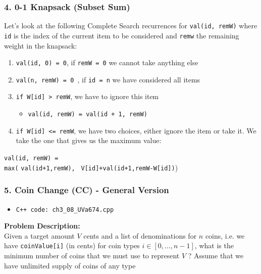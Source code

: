 \documentclass{beamer}
\begin{document}
\begin{frame}[fragile]
\frametitle{4. 0-1 Knapsack (Subset Sum)}

Let's look at the following Complete Search recurrences for \verb|val(id, remW)| where \verb|id| is the index of the current item to be considered and \verb|remw| the remaining weight in the knapsack:

\begin{enumerate}
    \item \color{blue}\verb|val(id, 0) = 0|\color{black}, if \verb|remW = 0| we cannot take anything else
    \pause    
    \item \color{blue}\verb|val(n, remW) = 0 |\color{black}, if \verb|id = n| we have considered all items
    \pause
    \item \color{blue}\verb|if W[id] > remW|\color{black}, we have to ignore this item
    \begin{itemize}
        \item \verb|val(id, remW) = val(id + 1, remW)|
    \end{itemize}
    \pause
    \item \color{blue}\verb|if W[id] <= remW|\color{black}, we have two choices, either \color{orange}ignore \color{black} the item or \color{cyan}take \color{black} it. We take the one that gives us the maximum value:
\end{enumerate}


\hspace{0.6cm} \verb|val(id, remW) = | \\

\hspace{1cm} \verb|max(| \color{orange}\verb|val(id+1,remW), |\color{black} \color{cyan}\verb|V[id]+val(id+1,remW-W[id])|\color{black})


\end{frame}


\begin{frame}[fragile]
\frametitle{5. Coin Change (CC) - General Version}

\begin{itemize}
    \item \color{red}\verb|C++ code: ch3_08_UVa674.cpp|\color{black}
\end{itemize} 

\vspace{0.3cm}

\color{red}\textbf{Problem Description: }\color{black} \\ 

Given a target amount $V$ cents and a list of denominations for $n$ coins, i.e. we have \verb|coinValue[i]| (in cents) for coin types $i \in [0,\ldots,n-1]$, what is the minimum number of coins that we must use to represent $V$ ? Assume that we have unlimited supply of coins of any type

\end{frame}
\end{document}
